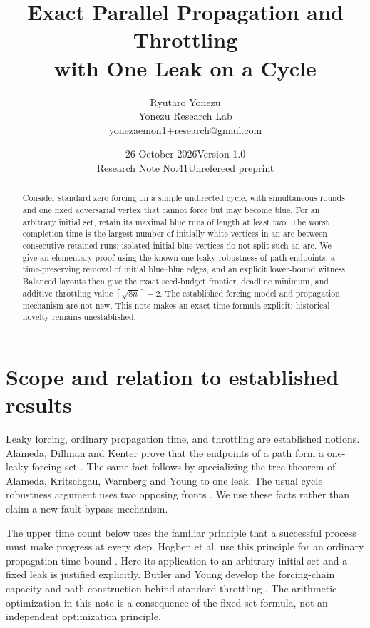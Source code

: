 \documentclass[11pt,a4paper]{article}
\title{Exact Parallel Propagation and Throttling\\with One Leak on a Cycle}
\author{Ryutaro Yonezu\\Yonezu Research Lab\\
\small\href{mailto:yonezaemon1+research@gmail.com}{yonezaemon1+research@gmail.com}}
\date{26 October 2026\quad\textbar\quad Version 1.0\\
\small Research Note No.41\quad\textbar\quad Unrefereed preprint}
\newcommand{\ceil}[1]{\left\lceil #1\right\rceil}
\begin{document}
\maketitle
\begin{abstract}
Consider standard zero forcing on a simple undirected cycle, with simultaneous
rounds and one fixed adversarial vertex that cannot force but may become blue.
For an arbitrary initial set, retain its maximal blue runs of length at least
two. The worst completion time is the largest number of initially white
vertices in an arc between consecutive retained runs; isolated initial blue
vertices do not split such an arc. We give an elementary proof using the known
one-leaky robustness of path endpoints, a time-preserving removal of initial
blue--blue edges, and an explicit lower-bound witness. Balanced layouts then
give the exact seed-budget frontier, deadline minimum, and additive throttling
value $\ceil{\sqrt{8n}}-2$. The established forcing model and propagation
mechanism are not new. This note makes an exact time formula explicit;
historical novelty remains unestablished.
\end{abstract}

\section{Scope and relation to established results}

Leaky forcing, ordinary propagation time, and throttling are established
notions. Alameda, Dillman and Kenter prove that the endpoints of a path form a
one-leaky forcing set \cite[Proposition 3.1, p.312]{ADK2024}. The same fact
follows by specializing the tree theorem of Alameda, Kritschgau, Warnberg and
Young \cite[Theorem 4.4]{AKWY2022} to one leak. The usual cycle robustness
argument uses two opposing fronts \cite[Proposition 3.4, p.313]{ADK2024}.
We use these facts rather than claim a new fault-bypass mechanism.

The upper time count below uses the familiar principle that a successful
process must make progress at every step. Hogben et al. use this principle
for an ordinary propagation-time bound \cite[Remark 1.8]{Hogben2012}.
Here its application to an arbitrary initial set and a fixed leak is justified
explicitly. Butler and Young develop the forcing-chain capacity and path
construction behind standard throttling \cite[Section 2, pp.66--68]{BY2013}.
The arithmetic optimization in this note is a consequence of the fixed-set
formula, not an independent optimization principle.
\end{document}
